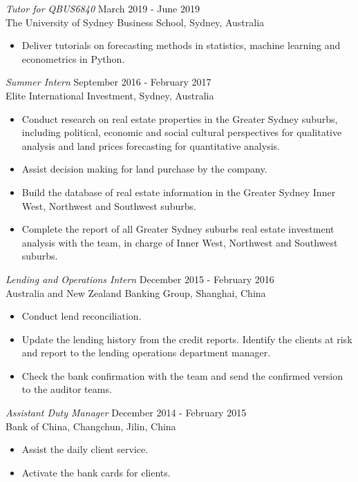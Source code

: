 \documentclass[margin, 11pt]{res} %
\begin{document}
\begin{resume}
{\sl Tutor for QBUS6840} \hfill March 2019 - June 2019 \\
{The University of Sydney Business School, Sydney, Australia}
\begin{itemize}
\item Deliver tutorials on forecasting methods in statistics, machine learning and econometrics in Python.
\end{itemize}

{\sl Summer Intern} \hfill September 2016 - February 2017 \\
{Elite International Investment, Sydney, Australia}
\begin{itemize}
\item Conduct research on real estate properties in the Greater Sydney suburbs, including political, economic and social cultural perspectives for qualitative analysis and land prices forecasting for quantitative analysis.
\item Assist decision making for land purchase by the company.
\item Build the database of real estate information in the Greater Sydney Inner West, Northwest and Southwest suburbs.
\item Complete the report of all Greater Sydney suburbs real estate investment analysis with the team, in charge of Inner West, Northwest and Southwest suburbs.
\end{itemize}

{\sl Lending and Operations Intern} \hfill December 2015 - February 2016 \\
{Australia and New Zealand Banking Group, Shanghai, China}
\begin{itemize}
\item Conduct lend reconciliation.
\item Update the lending history from the credit reports. Identify the clients at risk and report to the lending operations department manager.
\item Check the bank confirmation with the team and send the confirmed version to the auditor teams.
\end{itemize}

{\sl Assistant Duty Manager} \hfill December 2014 - February 2015 \\
{Bank of China, Changchun, Jilin, China}
\begin{itemize}
\item Assist the daily client service.
\item Activate the bank cards for clients.
\end{itemize}


\end{resume}
\end{document}
